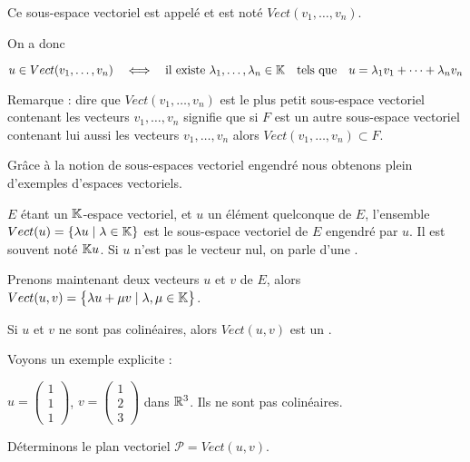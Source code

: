 Ce sous-espace vectoriel est appelé  et est 
 noté $Vect (v_1, \dots , v_n )$. 
 
 
\change

On a donc 

$u \in Vect( v_1, \dots , v_n ) \quad \Longleftrightarrow \quad
 \text{il existe} \ \lambda_1, \dots , \lambda_n \in \mathbb{K} \quad \text{tels que} \quad 
 u=\lambda_1v_1+ \dots+\lambda_nv_n$
 


Remarque :  dire que $Vect (v_1, \dots , v_n )$ est le plus petit sous-espace vectoriel 
contenant les vecteurs  $v_1, \ldots , v_n$ signifie que si 
$F$ est un autre sous-espace vectoriel contenant lui aussi les vecteurs $v_1, \ldots , v_n$
alors $Vect (v_1, \dots , v_n ) \subset F$.
 
 

\diapo

Grâce à la notion de sous-espaces vectoriel engendré nous obtenons plein d'exemples d'espaces vectoriels.


$E$ étant un $\mathbb{K}$-espace vectoriel, et $u$ un élément quelconque de $E$,
l'ensemble $Vect (u) =\{ \lambda u \mid \lambda \in \mathbb{K} \}$ est 
le sous-espace vectoriel de $E$ engendré par $u$.
Il est souvent noté $\mathbb{K} u$. Si $u$ n'est pas le vecteur nul, 
on parle d'une .
 
 
 \change
 
Prenons maintenant deux vecteurs $u$ et $v$ de $E$, alors
  $Vect (u,v) = \big\{ \lambda u + \mu v \mid \lambda, \mu \in \mathbb{K} \big\}$.
  
  
  Si $u$ et $v$ ne sont pas colinéaires, alors $Vect (u,v)$ est un .
  
  
\change

Voyons un exemple explicite :

$u = \left(\begin{smallmatrix}1 \\ 1 \\ 1 \end{smallmatrix}\right)$, $v = \left(\begin{smallmatrix}1 \\ 2 \\ 3 \end{smallmatrix}\right)$ 
  dans $\mathbb{R}^3$.
  Ils ne sont pas colinéaires.
  
  Déterminons le plan vectoriel $\mathcal{P} = Vect (u,v)$.


